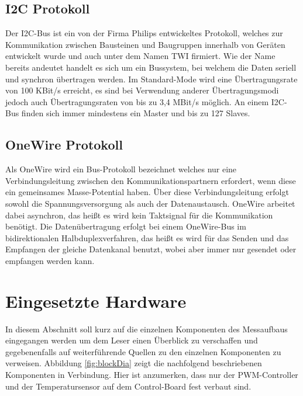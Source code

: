 \documentclass[a4paper,12pt]{scrartcl}
\begin{document}
\subsection{I2C Protokoll}

Der I2C-Bus ist ein von der Firma Philips entwickeltes Protokoll, welches zur Kommunikation zwischen Bausteinen und Baugruppen innerhalb von Geräten entwickelt wurde und auch unter dem Namen TWI firmiert. Wie der Name bereits andeutet handelt es sich um ein Bussystem, bei welchem die Daten seriell und synchron übertragen werden. Im Standard-Mode wird eine Übertragungsrate von 100 KBit/s erreicht, es sind bei Verwendung anderer Übertragungsmodi jedoch
auch Übertragungsraten von bis zu 3,4 MBit/s möglich. An einem I2C-Bus finden sich immer mindestens ein Master und bis zu 127 Slaves.\cite{speci2c}

\subsection{OneWire Protokoll}
Als OneWire wird ein Bus-Protokoll bezeichnet welches nur eine Verbindungsleitung zwischen den Kommunikationspartnern erfordert, wenn diese ein gemeinsames Masse-Potential haben. Über diese Verbindungsleitung erfolgt sowohl die Spannungsversorgung als auch der Datenaustausch. OneWire arbeitet dabei asynchron, das heißt es wird kein Taktsignal für die Kommunikation benötigt. Die Datenübertragung erfolgt bei einem OneWire-Bus im bidirektionalen Halbduplexverfahren, das heißt es wird für das Senden und das Empfangen der gleiche Datenkanal benutzt, wobei aber immer nur gesendet oder empfangen werden kann.\cite{spec1wire}

\clearpage
\section{Eingesetzte Hardware}
In diesem Abschnitt soll kurz auf die einzelnen Komponenten des Messaufbaus eingegangen werden um dem Leser einen Überblick zu verschaffen und gegebenenfalls auf weiterführende Quellen zu den einzelnen Komponenten zu verweisen. Abbildung \ref{fig:blockDia} zeigt die nachfolgend beschriebenen Komponenten in Verbindung. Hier ist anzumerken, dass nur der PWM-Controller und der Temperatursensor auf dem Control-Board fest verbaut sind.
\end{document}
